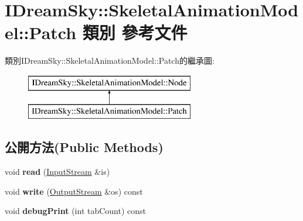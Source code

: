 \hypertarget{class_i_dream_sky_1_1_skeletal_animation_model_1_1_patch}{}\section{I\+Dream\+Sky\+:\+:Skeletal\+Animation\+Model\+:\+:Patch 類別 參考文件}
\label{class_i_dream_sky_1_1_skeletal_animation_model_1_1_patch}
類別\+I\+Dream\+Sky\+:\+:Skeletal\+Animation\+Model\+:\+:Patch的繼承圖\+:\begin{figure}[H]
\begin{center}
\leavevmode
\includegraphics[height=2.000000cm]{class_i_dream_sky_1_1_skeletal_animation_model_1_1_patch}
\end{center}
\end{figure}
\subsection*{公開方法(Public Methods)}
\begin{DoxyCompactItemize}
\item 
void {\bfseries read} (\hyperlink{class_i_dream_sky_1_1_input_stream}{Input\+Stream} \&is)\hypertarget{class_i_dream_sky_1_1_skeletal_animation_model_1_1_patch_a6c0d109e65d7be683489091f6db25cd4}{}\label{class_i_dream_sky_1_1_skeletal_animation_model_1_1_patch_a6c0d109e65d7be683489091f6db25cd4}

\item 
void {\bfseries write} (\hyperlink{class_i_dream_sky_1_1_output_stream}{Output\+Stream} \&os) const \hypertarget{class_i_dream_sky_1_1_skeletal_animation_model_1_1_patch_a521c9b7e17cbfc7b5392d12d129175f6}{}\label{class_i_dream_sky_1_1_skeletal_animation_model_1_1_patch_a521c9b7e17cbfc7b5392d12d129175f6}

\item 
void {\bfseries debug\+Print} (int tab\+Count) const \hypertarget{class_i_dream_sky_1_1_skeletal_animation_model_1_1_patch_ac06e7a32bdf500f32716cc064fba74f3}{}\label{class_i_dream_sky_1_1_skeletal_animation_model_1_1_patch_ac06e7a32bdf500f32716cc064fba74f3}

\end{DoxyCompactItemize}
